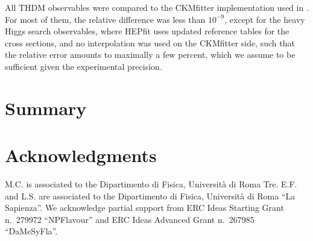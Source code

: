 \documentclass[preprint,3p,12pt]{elsarticle}
\begin{document}
All THDM observables were compared to the CKMfitter implementation used in \cite{Eberhardt:2013uba,Eberhardt:2013wia,Baglio:2014nea,Chowdhury:2015yja}. For most of them, the relative difference was less than $10^{-9}$, except for the heavy Higgs search observables, where HEPfit uses updated reference tables for the cross sections, and no interpolation was used on the CKMfitter side, such that the relative error amounts to maximally a few percent, which we assume to be sufficient given the experimental precision.


\section{Summary}



\section*{Acknowledgments}
M.C. is associated to the Dipartimento di Fisica, Universit\`a di Roma
Tre. E.F. and L.S. are associated to the Dipartimento di Fisica,
Universit\`a di Roma ``La Sapienza''. We acknowledge partial support
from ERC Ideas Starting Grant n.~279972 ``NPFlavour'' and ERC Ideas
Advanced Grant n.~267985 ``DaMeSyFla''.
\end{document}
